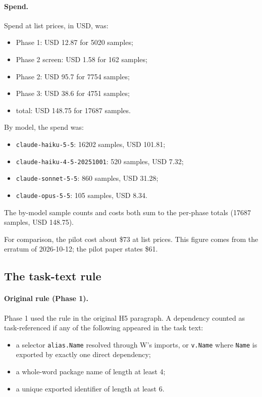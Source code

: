 \paragraph{Spend.} Spend at list prices, in USD, was:
\begin{itemize}
\item Phase 1: USD 12.87 for 5020 samples;
\item Phase 2 screen: USD 1.58 for 162 samples;
\item Phase 2: USD 95.7 for 7754 samples;
\item Phase 3: USD 38.6 for 4751 samples;
\item total: USD 148.75 for 17687 samples.
\end{itemize}

By model, the spend was:
\begin{itemize}
\item \texttt{claude-haiku-5-5}: 16202 samples, USD 101.81;
\item \texttt{claude-haiku-4-5-20251001}: 520 samples, USD 7.32;
\item \texttt{claude-sonnet-5-5}: 860 samples, USD 31.28;
\item \texttt{claude-opus-5-5}: 105 samples, USD 8.34.
\end{itemize}

The by-model sample counts and costs both sum to the per-phase totals (17687 samples, USD 148.75).

For comparison, the pilot cost about \$73 at list prices. This figure comes from the erratum of 2026-10-12; the pilot paper states \$61.

\subsection{The task-text rule}\label{sec:taskrule}

\paragraph{Original rule (Phase 1).} Phase 1 used the rule in the original H5 paragraph. A dependency counted as task-referenced if any of the following appeared in the task text:
\begin{itemize}
\item a selector \texttt{alias.Name} resolved through W's imports, or \texttt{v.Name} where \texttt{Name} is exported by exactly one direct dependency;
\item a whole-word package name of length at least 4;
\item a unique exported identifier of length at least 6.
\end{itemize}

